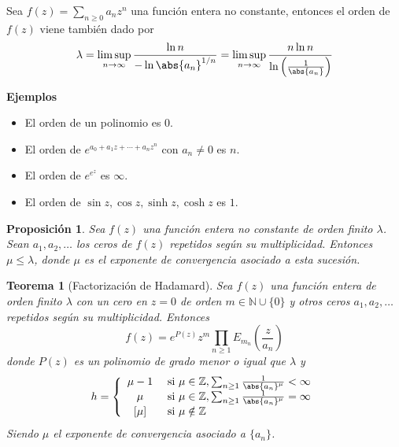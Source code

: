 \documentclass[12pt]{book}
\newtheorem{theorem}{Teorema}[chapter]
\newtheorem{prop}{Proposición}[chapter]
\newcommand{\N}{\mathbb{N}}
\newcommand{\Z}{\mathbb{Z}}
\begin{document}
Sea $f(z)= \sum_{n\geq 0} a_n z^n$ una función entera no constante, entonces el orden de $f(z)$ viene también dado por 
$$\lambda = \limsup_{n\to \infty} \frac{\ln n}{-\ln \abs{a_n}^{1/n}} = \limsup_{n\to \infty} \frac{n\ln n}{\ln \left(\frac{1}{\abs{a_n}}\right)}
$$

\textbf{Ejemplos}

\begin{itemize}
\item El orden de un polinomio es $0$.
\item El orden de $e^{a_0+a_1z+\cdots+a_nz^n}$ con $a_n \neq 0$ es $n$.
\item El orden de $e^{e^z}$ es $\infty$.
\item El orden de $\sin z, \cos z, \sinh z, \cosh z$ es $1$.
\end{itemize}

\begin{prop}
Sea $f(z)$ una función entera no constante de orden finito $\lambda$. Sean $a_1,a_2,\ldots$ los ceros de $f(z)$ repetidos según su multiplicidad. Entonces $\mu \leq \lambda$, donde $\mu$ es el exponente de convergencia asociado a esta sucesión.
\end{prop}


\begin{theorem}[Factorización de Hadamard]
Sea $f(z)$ una función entera de orden finito $\lambda$ con un cero en $z=0$ de orden $m \in \N \cup\{0\}$ y otros ceros $a_1,a_2,\ldots$ repetidos según su multiplicidad. Entonces
$$f(z) = e^{P(z)}z^m \prod_{n\geq 1} E_{m_n}\left(\frac{z}{a_n}\right)$$
donde $P(z)$ es un polinomio de grado menor o igual que $\lambda$ y 
$$
h  = \left\lbrace\begin{array}{cl}
	\mu - 1 & \text{ si } \mu \in \Z, \sum_{n\geq 1}\frac{1}{\abs{a_n}^\mu} < \infty\\
	\mu & \text{ si } \mu \in \Z, \sum_{n\geq 1}\frac{1}{\abs{a_n}^\mu} = \infty\\
	\left[\mu\right]  & \text{ si } \mu \notin \Z
\end{array}\right.
$$
Siendo $\mu$ el exponente de convergencia asociado a $\{a_n\}$.
\end{theorem}
\end{document}
